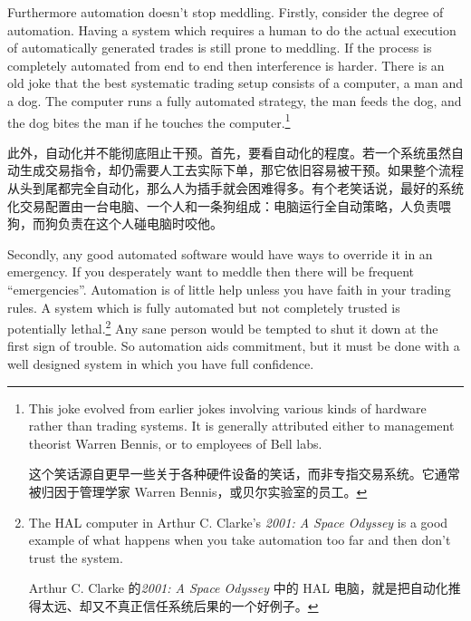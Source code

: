 \begin{englishblock} Furthermore automation doesn't stop meddling. Firstly, consider the degree of automation. Having a system which requires a human to do the actual execution of automatically generated trades is still prone to meddling. If the process is completely automated from end to end then interference is harder. There is an old joke that the best systematic trading setup consists of a computer, a man and a dog. The computer runs a fully automated strategy, the man feeds the dog, and the dog bites the man if he touches the computer.\footnote{This joke evolved from earlier jokes involving various kinds of hardware rather than trading systems. It is generally attributed either to management theorist Warren Bennis, or to employees of Bell labs. \par 这个笑话源自更早一些关于各种硬件设备的笑话，而非专指交易系统。它通常被归因于管理学家 Warren Bennis，或贝尔实验室的员工。}\end{englishblock}

\begin{chineseblock}此外，自动化并不能彻底阻止干预。首先，要看自动化的程度。若一个系统虽然自动生成交易指令，却仍需要人工去实际下单，那它依旧容易被干预。如果整个流程从头到尾都完全自动化，那么人为插手就会困难得多。有个老笑话说，最好的系统化交易配置由一台电脑、一个人和一条狗组成：电脑运行全自动策略，人负责喂狗，而狗负责在这个人碰电脑时咬他。\end{chineseblock}

\bipairgap

\begin{englishblock} Secondly, any good automated software would have ways to override it in an emergency. If you desperately want to meddle then there will be frequent ``emergencies''. Automation is of little help unless you have faith in your trading rules. A system which is fully automated but not completely trusted is potentially lethal.\footnote{The HAL computer in Arthur C. Clarke's \textit{2001: A Space Odyssey} is a good example of what happens when you take automation too far and then don't trust the system. \par Arthur C. Clarke 的\textit{2001: A Space Odyssey} 中的 HAL 电脑，就是把自动化推得太远、却又不真正信任系统后果的一个好例子。} Any sane person would be tempted to shut it down at the first sign of trouble. So automation aids commitment, but it must be done with a well designed system in which you have full confidence. \end{englishblock}

